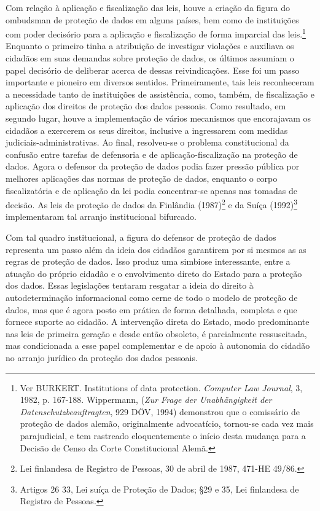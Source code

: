 Com relação à aplicação e fiscalização das leis, houve a criação da
figura do ombudsman de proteção de dados em alguns países, bem como de
instituições com poder decisório para a aplicação e fiscalização de
forma imparcial das leis.\footnote{Ver BURKERT. Institutions of data
  protection. \emph{Computer Law Journal}, 3, 1982, p. 167-188.
  Wippermann, (\emph{Zur Frage der Unabhängigkeit der
  Datenschutzbeauftragten}, 929 DÖV, 1994) demonstrou que o comissário
  de proteção de dados alemão, originalmente advocatício, tornou-se cada
  vez mais parajudicial, e tem rastreado eloquentemente o início desta
  mudança para a Decisão de Censo da Corte Constitucional Alemã.}
Enquanto o primeiro tinha a atribuição de investigar violações e
auxiliava os cidadãos em suas demandas sobre proteção de dados, os
últimos assumiam o papel decisório de deliberar acerca de dessas
reivindicações. Esse foi um passo importante e pioneiro em diversos
sentidos. Primeiramente, tais leis reconheceram a necessidade tanto de
instituições de assistência, como, também, de fiscalização e aplicação
dos direitos de proteção dos dados pessoais. Como resultado, em segundo
lugar, houve a implementação de vários mecanismos que encorajavam os
cidadãos a exercerem os seus direitos, inclusive a ingressarem com
medidas judiciais-administrativas. Ao final, resolveu-se o problema
constitucional da confusão entre tarefas de defensoria e de
aplicação-fiscalização na proteção de dados. Agora o defensor da
proteção de dados podia fazer pressão pública por melhores aplicações
das normas de proteção de dados, enquanto o corpo fiscalizatória e de
aplicação da lei podia concentrar-se apenas nas tomadas de decisão. As
leis de proteção de dados da Finlândia (1987)\footnote{Lei finlandesa de
  Registro de Pessoas, 30 de abril de 1987, 471-HE 49/86.} e da Suíça
(1992)\footnote{Artigos 26 33, Lei suíça de Proteção de Dados; §29 e 35,
  Lei finlandesa de Registro de Pessoas.} implementaram tal arranjo
institucional bifurcado.

Com tal quadro institucional, a figura do defensor de proteção de dados
representa um passo além da ideia dos cidadãos garantirem por si mesmos
as as regras de proteção de dados. Isso produz uma simbiose
interessante, entre a atuação do próprio cidadão e o envolvimento direto
do Estado para a proteção dos dados. Essas legislações tentaram resgatar
a ideia do direito à autodeterminação informacional como cerne de todo o
modelo de proteção de dados, mas que é agora posto em prática de forma
detalhada, completa e que fornece suporte ao cidadão. A intervenção
direta do Estado, modo predominante nas leis de primeira geração e desde
então obsoleto, é parcialmente ressuscitada, mas condicionada a esse
papel complementar e de apoio à autonomia do cidadão no arranjo jurídico
da proteção dos dados pessoais.

